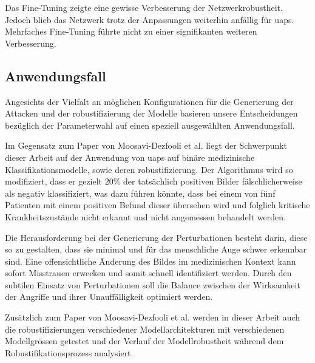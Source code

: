 Das Fine-Tuning zeigte eine gewisse Verbesserung der Netzwerkrobustheit. Jedoch blieb das Netzwerk trotz der Anpassungen weiterhin anfällig für \acrshort{uap}s. Mehrfaches Fine-Tuning führte nicht zu einer signifikanten weiteren Verbesserung.

\newpage

\subsection{Anwendungsfall} 
Angesichts der Vielfalt an möglichen Konfigurationen für die Generierung der Attacken und der \Gls{robustifizierung} der Modelle basieren unsere Entscheidungen bezüglich der Parameterwahl auf einen speziell ausgewählten Anwendungsfall. 

Im Gegensatz zum Paper von Moosavi-Dezfooli et al. \cite{moosavi-dezfooli_universal_2017} liegt der Schwerpunkt dieser Arbeit auf der Anwendung von \acrlong{uap}s auf binäre medizinische Klassifikationsmodelle, sowie deren \Gls{robustifizierung}. Der Algorithmus wird so modifiziert, dass er gezielt 20\% der tatsächlich positiven Bilder fälschlicherweise als negativ klassifiziert, was dazu führen könnte, dass bei einem von fünf Patienten mit einem positiven Befund dieser übersehen wird und folglich kritische Krankheitszustände nicht erkannt und nicht angemessen behandelt werden.

Die Herausforderung bei der Generierung der Perturbationen besteht darin, diese so zu gestalten, dass sie minimal und für das menschliche Auge schwer erkennbar sind. Eine offensichtliche Änderung des Bildes im medizinischen Kontext kann sofort Misstrauen erwecken und somit schnell identifiziert werden. Durch den subtilen Einsatz von Perturbationen soll die Balance zwischen der Wirksamkeit der Angriffe und ihrer Unauffälligkeit optimiert werden. 

Zusätzlich zum Paper von Moosavi-Dezfooli et al. \cite{moosavi-dezfooli_universal_2017} werden in dieser Arbeit auch die \Gls{robustifizierung}en verschiedener Modellarchitekturen mit verschiedenen Modellgrössen getestet und der Verlauf der Modellrobustheit während dem Robustifikationsprozess analysiert.